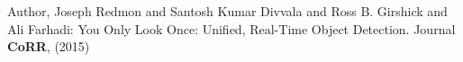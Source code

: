 \documentclass[runningheads]{llncs}
\begin{document}
\begin{table}[h]


%

%
%



\begin{thebibliography}{8}
Author, Joseph Redmon and Santosh Kumar Divvala and Ross B. Girshick and Ali Farhadi: You Only Look Once: Unified, Real-Time Object Detection. Journal \textbf{CoRR}, (2015)


\end{thebibliography}
\end{table}
\end{document}
